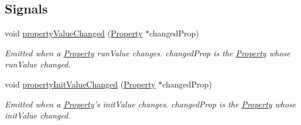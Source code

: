 \subsection*{Signals}
\begin{DoxyCompactItemize}
\item 
\hypertarget{class_picto_1_1_property_table_a7a0ab3ba84131726281eabe4994a6f8a}{void \hyperlink{class_picto_1_1_property_table_a7a0ab3ba84131726281eabe4994a6f8a}{property\-Value\-Changed} (\hyperlink{class_picto_1_1_property}{Property} $\ast$changed\-Prop)}\label{class_picto_1_1_property_table_a7a0ab3ba84131726281eabe4994a6f8a}

\begin{DoxyCompactList}\small\item\em Emitted when a \hyperlink{class_picto_1_1_property}{Property} run\-Value changes. changed\-Prop is the \hyperlink{class_picto_1_1_property}{Property} whose run\-Value changed. \end{DoxyCompactList}\item 
\hypertarget{class_picto_1_1_property_table_a7ea020fb16e6b5182c682ab04be99581}{void \hyperlink{class_picto_1_1_property_table_a7ea020fb16e6b5182c682ab04be99581}{property\-Init\-Value\-Changed} (\hyperlink{class_picto_1_1_property}{Property} $\ast$changed\-Prop)}\label{class_picto_1_1_property_table_a7ea020fb16e6b5182c682ab04be99581}

\begin{DoxyCompactList}\small\item\em Emitted when a \hyperlink{class_picto_1_1_property}{Property}'s init\-Value changes. changed\-Prop is the \hyperlink{class_picto_1_1_property}{Property} whose init\-Value changed. \end{DoxyCompactList}\end{DoxyCompactItemize}
